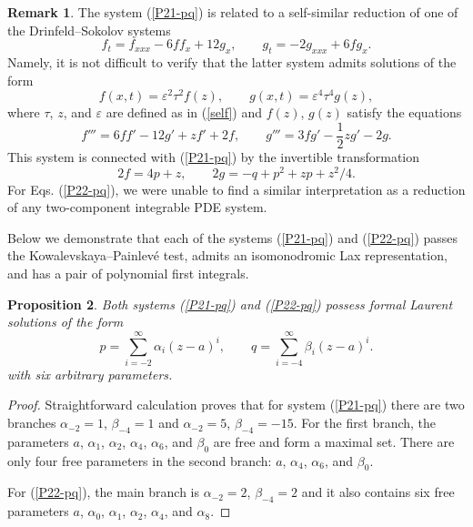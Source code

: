 \documentclass[11pt]{article}
\theoremstyle{plain}
\newtheorem{proposition}{Proposition}
\theoremstyle{definition}
\newtheorem{remark}[proposition]{Remark}
\begin{document}
\begin{remark}
The system (\ref{P21-pq}) is related to a self-similar reduction of one of the Drinfeld--Sokolov systems \cite{Drinfeld_Sokolov_1985}
\begin{equation}\label{DS-III}
 f_t=f_{xxx}-6ff_x+12g_x,\qquad g_t=-2g_{xxx}+6fg_x.
\end{equation}
Namely, it is not difficult to verify that the latter system admits solutions of the form
\[
 f(x,t)= \varepsilon^2\tau^2f(z),\qquad g(x,t)= \varepsilon^4\tau^4g(z),
\]
where $\tau$, $z$, and $\varepsilon$ are defined as in (\ref{self}) and $f(z)$, $g(z)$ satisfy the equations
\[
 f'''=6ff'-12g'+zf'+2f,\qquad g'''=3fg'-\frac{1}{2}zg'-2g.
\]
This system is connected with (\ref{P21-pq}) by the invertible transformation
\[
 2f=4p+z,\qquad 2g=-q+p^2+zp+z^2/4. 
\]
For Eqs. (\ref{P22-pq}), we were unable to find a similar interpretation as a reduction of any two-component integrable PDE system.
\end{remark}

Below we demonstrate that each of the systems (\ref{P21-pq}) and (\ref{P22-pq}) passes the Kowalevskaya--Painlev\'e test, admits an isomonodromic Lax representation, and has a pair of polynomial first integrals. 

\begin{proposition}
Both systems (\ref{P21-pq}) and (\ref{P22-pq}) possess formal Laurent solutions of the form 
$$
p=\sum_{i=-2}^{\infty} \alpha_i (z-a)^i, \qquad q=\sum_{i=-4}^{\infty} \beta_i (z-a)^i.
$$
with six arbitrary parameters.
\end{proposition}

\begin{proof}
Straightforward calculation proves that for system (\ref{P21-pq}) there are two branches $\alpha_{-2}=1$, $\beta_{-4}=1$ and $\alpha_{-2}=5$, $\beta_{-4}=-15$. For the first branch, the parameters $a$, $\alpha_1$, $\alpha_2$, $\alpha_4$, $\alpha_6$, and $\beta_0$ are free and form a maximal set. There are only four free parameters in the second branch: $a$, $\alpha_4$, $\alpha_6$, and $\beta_0$.    

For (\ref{P22-pq}), the main branch is $\alpha_{-2}=2$, $\beta_{-4}=2$ and it also contains six free parameters $a$, $\alpha_0$, $\alpha_1$, $\alpha_2$, $\alpha_4$, and $\alpha_8$.  
\end{proof}
\end{document}
